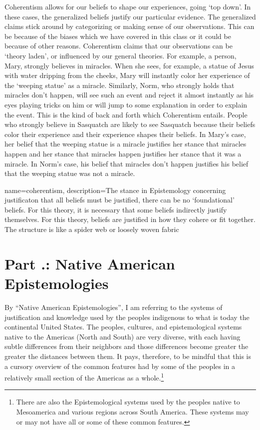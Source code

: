 Coherentism allows for our beliefs to shape our experiences, going `top down'. In these cases, the generalized beliefs justify our particular evidence. The generalized claims stick around by categorizing or making sense of our observations. This can be because of the biases which we have covered in this class or it could be because of other reasons. Coherentism claims that our observations can be `theory laden', or influenced by our general theories. For example, a person, Mary, strongly believes in miracles. When she sees, for example, a statue of Jesus with water dripping from the cheeks, Mary will instantly color her experience of the `weeping statue' as a miracle. Similarly, Norm, who strongly holds that miracles don't happen, will see such an event and reject it almost instantly as his eyes playing tricks on him or will jump to some explanation in order to explain the event. This is the kind of back and forth which Coherentism entails. People who strongly believe in Sasquatch are likely to see Sasquatch because their beliefs color their experience and their experience shapes their beliefs. In Mary's case, her belief that the weeping statue is a miracle justifies her stance that miracles happen and her stance that miracles happen justifies her stance that it was a miracle. In Norm's case, his belief that miracles don't happen justifies his belief that the weeping statue was not a miracle. 


{
name=coherentism,
description={The stance in Epistemology concerning justificaton that all beliefs must be justified, there can be no `foundational' beliefs. For this theory, it is necessary that some beliefs indirectly justify themselves. For this theory, beliefs are justified in how they cohere or fit together. The structure is like a spider web or loosely woven fabric}
}


\section{Part \thechapcount.\theseccount: Native American Epistemologies}
By ``Native American Epistemologies'', I am referring to the systems of justification and knowledge used by the peoples indigenous to what is today the continental United States. The peoples, cultures, and epistemological systems native to the Americas (North and South) are very diverse, with each having subtle differences from their neighbors and those differences become greater the greater the distances between them. It pays, therefore, to be mindful that this is a cursory overview of the common features had by some of the peoples in a relatively small section of the Americas as a whole.\footnote{There are also the Epistemological systems used by the peoples native to Mesoamerica and various regions across South America. These systems may or may not have all or some of these common features.}  

